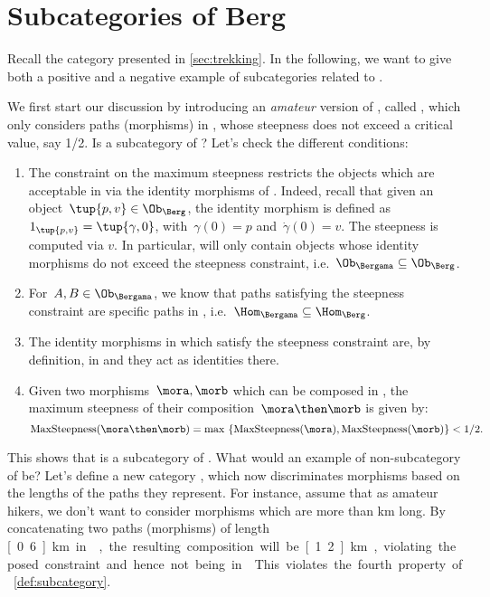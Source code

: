 
\section{Subcategories of Berg}
\label{sec:subcat_berg}

Recall the category \Berg presented in \cref{sec:trekking}. In the following, we want to give both a positive and a negative example of subcategories related to \Berg.


We first start our discussion by introducing an \emph{amateur} version of \Berg, called \Bergama, which only considers paths (morphisms) in \Berg, whose steepness does not exceed a critical value, say 1/2. Is \Bergama a subcategory of \Berg? Let's check the different conditions:
\begin{enumerate}
    \item The constraint on the maximum steepness restricts the objects which are acceptable in \Bergama via the identity morphisms of \Berg. Indeed, recall that given an object~$\tup{p,v}\in \Ob_{\Berg}$, the identity morphism is defined as~$1_{\tup{p,v}}=\tup{\gamma,0}$, with~$\gamma(0)=p$ and~$\dot{\gamma}(0)=v$. The steepness is computed via $v$. In particular, \Bergama will only contain objects whose identity morphisms do not exceed the steepness constraint, i.e.~$\Ob_\Bergama \subseteq \Ob_\Berg$.
    \item For~$A,B\in \Ob_{\Bergama}$, we know that paths satisfying the steepness constraint are specific paths in \Berg, i.e.~$\Hom_{\Bergama}\subseteq \Hom_{\Berg}$.
    \item The identity morphisms in \Berg which satisfy the steepness constraint are, by definition, in \Bergama and they act as identities there.
    \item Given two morphisms~$\mora,\morb$ which can be composed in \Bergama, the maximum steepness of their composition~$\mora \then \morb$ is given by:
    \begin{equation*}
        \text{MaxSteepness}(\mora \then \morb)=\max \ \{\text{MaxSteepness}(\mora),\text{MaxSteepness}(\morb)\}<1/2.
    \end{equation*}
\end{enumerate}

This shows that \Bergama is a subcategory of \Berg. What would an example of non-subcategory of \Berg be? Let's define a new category \Berglazy, which now discriminates morphisms based on the lengths of the paths they represent. For instance, assume that as amateur hikers, we don't want to consider morphisms which are more than \unit[1]{km} long. By concatenating two paths (morphisms) of length \unit[0.6]{km} in \Berglazy, the resulting composition will be \unit[1.2]{km}, violating the posed constraint and hence not being in \Berglazy. This violates the fourth property of \cref{def:subcategory}.


